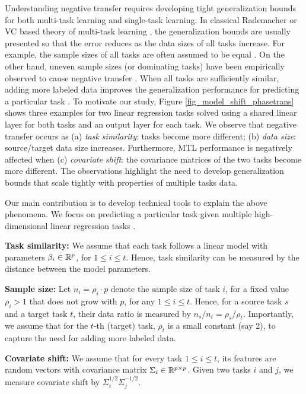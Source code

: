 Understanding negative transfer requires developing tight generalization bounds for both multi-task learning and single-task learning.
In classical Rademacher or VC based theory of multi-task learning \cite{B00,AZ05,M06}, the generalization bounds are usually presented so that the error reduces as the data sizes of all tasks increase.
For example, the sample sizes of all tasks are often assumed to be equal \cite{B00,LPTV09,LPVT11,MPR16}.
On the other hand, uneven sample sizes (or dominating tasks) have been empirically observed to cause negative transfer \cite{YKGLHF20}.
When all tasks are sufficiently similar, adding more labeled data improves the generalization performance for predicting a particular task \cite{WZR20}.
To motivate our study, Figure \ref{fig_model_shift_phasetrans} shows three examples for two linear regression tasks solved using a shared linear layer for both tasks and an output layer for each task.
We observe that negative transfer occurs as (a) \textit{task similarity}: tasks become more different; (b) \textit{data size}: source/target data size increases.
Furthermore, MTL performance is negatively affected when (c) \textit{covariate shift}: the covariance matrices of the two tasks become more different.
The observations highlight the need to develop generalization bounds that scale tightly with properties of multiple tasks data.

Our main contribution is to develop technical tools to explain the above phenomena.
We focus on predicting a particular task given multiple high-dimensional linear regression tasks \cite{HMRT19,BLLT20}.
\squishlist
	\item \textbf{Task similarity:} We assume that each task follows a linear model with parameters $\beta_i\in\mathbb{R}^p$, for $1\le i\le t$.
	Hence, task similarity can be measured by the distance between the model parameters.
	\item \textbf{Sample size:} Let $n_i = \rho_i \cdot p$ denote the sample size of task $i$, for a fixed value $\rho_i > 1$ that does not grow with $p$, for any $1\le i\le t$.
	Hence, for a source task $s$ and a target task $t$, their data ratio is measured by $n_s / n_t = \rho_s / \rho_t$.
	Importantly, we assume that for the $t$-th (target) task, $\rho_t$ is a small constant (say 2), to capture the need for adding more labeled data.
	\item \textbf{Covariate shift:} We assume that for every task $1\le i\le t$, its features are random vectors with covariance matrix $\Sigma_i\in\mathbb{R}^{p\times p}$.
	Given two tasks $i$ and $j$, we measure covariate shift by $\Sigma_i^{1/2}\Sigma_j^{-1/2}$.
\squishend

